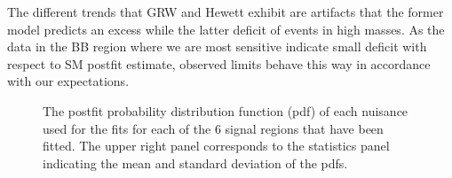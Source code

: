 The different trends that GRW and Hewett exhibit are artifacts that the former model predicts an excess while the latter deficit of events in high masses. As the data in the BB region where we are most sensitive indicate small deficit with respect to SM postfit estimate, observed limits behave this way in accordance with our expectations. 




\begin{figure}[!htbp]{
\caption{The postfit probability distribution function (pdf) of each nuisance used for the fits for each of the 6 signal regions that have been fitted. The upper right panel corresponds to the statistics panel indicating the mean and standard deviation of the pdfs.}
\label{fig:Postfit_Nuisances_real} }
\end{figure}


